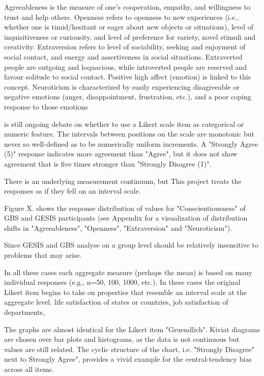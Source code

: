 Agreeableness is the measure of one's cooperation, empathy, and willingness to trust and help others. Openness refers to openness to new experiences (i.e., whether one is timid/hesitant or eager about new objects or situations), level of inquisitiveness or curiousity, and level of preference for variety, novel stimuli and creativity. Extraversion refers to level of sociability, seeking and enjoyment of social contact, and energy and assertiveness in social situations. Extraverted people are outgoing and loquacious, while introverted people are reserved and favour solitude to social contact. Positive high affect (emotion) is linked to this concept. Neuroticism is characterized by easily experiencing disagreeable or negative emotions (anger, disappointment, frustration, etc.), and a poor coping response to those emotions

 is still ongoing debate on whether to use a Likert scale item as categorical or numeric feature. The intervals between positions on the scale are monotonic but never so well-defined as to be numerically uniform increments. A "Strongly Agree (5)" response indicates more agreement than "Agree", but it does not show agreement that is five times stronger than "Strongly Disagree (1)". 

There is an underlying measurement continuum, but  
This project treats the responses as if they fell on an interval scale.

Figure X. shows the response distribution of values for "Conscientiousness" of GBS and GESIS participants (see Appendix for a visualization of distribution shifts in "Agreeableness", "Openness", "Extraversion" and "Neuroticism").

Since GESIS and GBS analyse  on a group level should be relatively insensitive to problems that may arise.

In all these cases each aggregate measure (perhaps the mean) is based on many individual responses (e.g., n=50, 100, 1000, etc.). In these cases the original Likert item begins to take on properties that resemble an interval scale at the aggregate level.
life satisfaction of states or countries,
job satisfaction of departments,

The graphs are almost identical for the Likert item "Gruendlich". Kiviat diagrams are chosen over bar plots and histograms, as the data is not continuous but values are still related. The cyclic structure of the chart, i.e. "Strongly Disagree" next to Strongly Agree", provides a vivid example for the central-tendency bias across all items.

